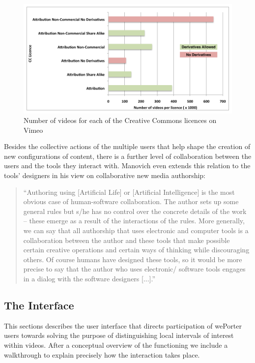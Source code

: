 \begin{figure}[htbp]
  \centering
    \includegraphics[scale=1]{img/vimeoCC}
  \caption{Number of videos for each of the Creative Commons licences on Vimeo}
  \label{fig:vimeoCC}
\end{figure}

Besides the collective actions of the multiple users that help shape the creation of new configurations of content, there is a further level of collaboration between the users and the tools they interact with. Manovich even extends this relation to the tools' designers in his view on collaborative new media authorship:

\begin{quote}
  ``Authoring using [Artificial Life] or [Artificial Intelligence] is the most obvious case of human-software collaboration. The author sets up some general rules but s/he has no control over the concrete details of the work – these emerge as a result of the interactions of the rules. More generally, we can say that all authorship that uses electronic and computer tools is a collaboration between the author and these tools that make possible certain creative operations and certain ways of thinking while discouraging others. Of course humans have designed these tools, so it would be more precise to say that the author who uses electronic/ software tools engages in a dialog with the software designers [...].''\cite{manovichAuthor}
\end{quote}


\subsection{The Interface}
\label{sec:weporter_interface} 
This sections describes the user interface that directs participation of wePorter users towards solving the purpose of distinguishing local intervals of interest within videos. After a conceptual overview of the functioning we include a walkthrough to explain precisely how the interaction takes place.

